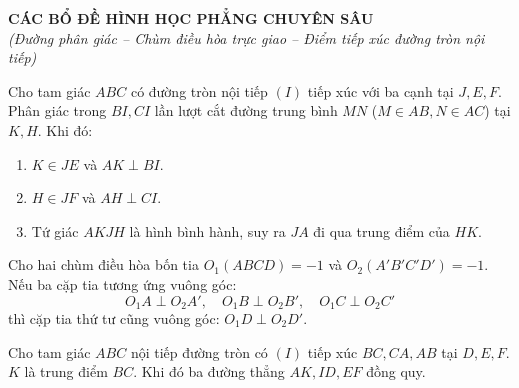 \documentclass[12pt,a4paper]{article}
\begin{document}
\begin{center}
	{\Large \textbf{CÁC BỔ ĐỀ HÌNH HỌC PHẲNG CHUYÊN SÂU}}\\[2mm]
	{\small \textit{(Đường phân giác -- Chùm điều hòa trực giao -- Điểm tiếp xúc đường tròn nội tiếp)}}
\end{center}
\vspace{4mm}

\begin{tcolorbox}[colback=blue!5!white,colframe=blue!75!black,title=\textbf{Bổ đề 1: Tính chất Giao điểm của Phân giác và Đường trung bình}]
Cho tam giác $ABC$ có đường tròn nội tiếp $(I)$ tiếp xúc với ba cạnh tại $J, E, F$. Phân giác trong $BI, CI$ lần lượt cắt đường trung bình $MN$ ($M \in AB, N \in AC$) tại $K, H$. Khi đó:
\begin{enumerate}
    \item $K \in JE$ và $AK \perp BI$.
    \item $H \in JF$ và $AH \perp CI$.
    \item Tứ giác $AKJH$ là hình bình hành, suy ra $JA$ đi qua trung điểm của $HK$.
\end{enumerate}
\end{tcolorbox}

\vspace{3mm}

\begin{tcolorbox}[colback=teal!5!white,colframe=teal!75!black,title=\textbf{Bổ đề 2: Chùm điều hòa Trực giao}]
Cho hai chùm điều hòa bốn tia $O_1(ABCD) = -1$ và $O_2(A'B'C'D') = -1$. Nếu ba cặp tia tương ứng vuông góc:
\[
O_1A \perp O_2A', \quad O_1B \perp O_2B', \quad O_1C \perp O_2C'
\]
thì cặp tia thứ tư cũng vuông góc: $O_1D \perp O_2D'$.
\end{tcolorbox}

\vspace{3mm}

\begin{tcolorbox}[colback=orange!5!white,colframe=orange!75!black,title=\textbf{Bổ đề 3: Sự đồng quy giữa Trung tuyến và Tiếp điểm}]
Cho tam giác $ABC$ nội tiếp đường tròn có $(I)$ tiếp xúc $BC, CA, AB$ tại $D, E, F$. $K$ là trung điểm $BC$. Khi đó ba đường thẳng $AK, ID, EF$ đồng quy.
\end{tcolorbox}
\end{document}
